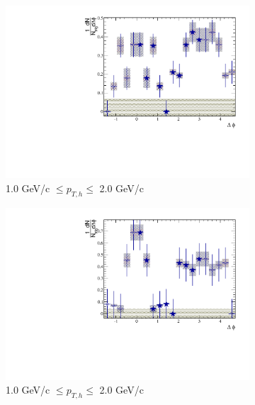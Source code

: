 \begin{figure}[htbp]
\begin{subfigure}{0.5\textwidth}
		\includegraphics[width=\textwidth]{Plots/Correlations/subtracted/NPE_eh_corr_subtracted_primpt_4_5_cent_2_3_assopt_2_2.pdf}
		\caption{1.0 GeV/c $\leq p_{T,h} \leq$ 2.0 GeV/c}
		\label{fig:Sub4060c}
	\end{subfigure}	
	\begin{subfigure}{0.5\textwidth}
		\includegraphics[width=\textwidth]{Plots/Correlations/subtracted/NPE_eh_corr_subtracted_primpt_6_8_cent_2_3_assopt_2_2.pdf}
		\caption{1.0 GeV/c $\leq p_{T,h} \leq$ 2.0 GeV/c}
		\label{fig:Sub4060d}
	\end{subfigure}	
	\begin{subfigure}{0.5\textwidth}

\end{subfigure}
\end{figure}

